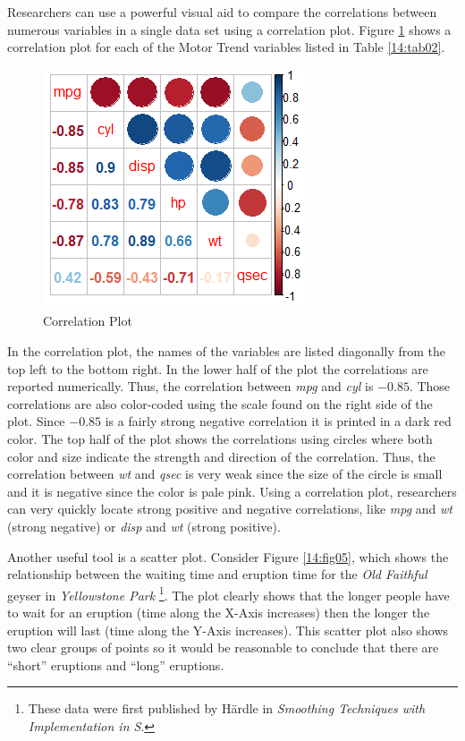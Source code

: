 Researchers can use a powerful visual aid to compare the correlations between numerous variables in a single data set using a correlation plot. Figure \ref{14:fig04} shows a correlation plot for each of the Motor Trend variables listed in Table \ref{14:tab02}.

\begin{figure}[H]
	\centering
	\includegraphics[width=\maxwidth{.95\linewidth}]{gfx/14-corplot}
	\caption{Correlation Plot}
	\label{14:fig04}
\end{figure}

In the correlation plot, the names of the variables are listed diagonally from the top left to the bottom right. In the lower half of the plot the correlations are reported numerically. Thus, the correlation between \textit{mpg} and \textit{cyl} is $ -0.85 $. Those correlations are also color-coded using the scale found on the right side of the plot. Since $ -0.85 $ is a fairly strong negative correlation it is printed in a dark red color. The top half of the plot shows the correlations using circles where both color and size indicate the strength and direction of the correlation. Thus, the correlation between \textit{wt} and \textit{qsec} is very weak since the size of the circle is small and it is negative since the color is pale pink. Using a correlation plot, researchers can very quickly locate strong positive and negative correlations, like \textit{mpg} and \textit{wt} (strong negative) or \textit{disp} and \textit{wt} (strong positive).

Another useful tool is a scatter plot. Consider Figure \ref{14:fig05}, which shows the relationship between the waiting time and eruption time for the \textit{Old Faithful} geyser in \textit{Yellowstone Park} \footnote{These data were first published by H{\"a}rdle in \textit{Smoothing Techniques with Implementation in S}\cite{hardle2012smoothing}.}. The plot clearly shows that the longer people have to wait for an eruption (time along the X-Axis increases) then the longer the eruption will last (time along the Y-Axis increases). This scatter plot also shows two clear groups of points so it would be reasonable to conclude that there are ``short'' eruptions and ``long'' eruptions.

